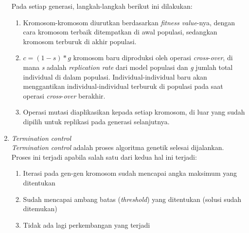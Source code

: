 \begin{enumerate}[1.]
Pada setiap generasi, langkah-langkah berikut ini dilakukan:
\begin{enumerate}[1.]
	\item Kromosom-kromosom diurutkan berdasarkan \textit{fitness value}-nya, dengan cara kromosom terbaik ditempatkan di awal populasi, sedangkan kromosom terburuk di akhir populasi.
	\item \begin{math} c = (1 - s) * g \end{math} kromosom baru diproduksi oleh operasi \textit{cross}-\textit{over}, di mana \textit{s} adalah \textit{replication rate} dari model populasi dan \textit{g} jumlah total individual di dalam populasi. Individual-individual baru akan menggantikan individual-individual terburuk di populasi pada saat operasi \textit{cross}-\textit{over} berakhir.
	\item Operasi mutasi diaplikasikan kepada setiap kromosom, di luar yang sudah dipilih untuk replikasi pada generasi selanjutnya.
\end{enumerate}

\item \textit{Termination control}
\\
\textit{Termination control} adalah proses algoritma genetik selesai dijalankan. Proses ini terjadi apabila salah satu dari kedua hal ini terjadi:
	\begin{enumerate}[1.]
		\item Iterasi pada gen-gen kromosom sudah mencapai angka maksimum yang ditentukan
		\item Sudah mencapai ambang batas (\textit{threshold}) yang ditentukan (solusi sudah ditemukan)
		\item Tidak ada lagi perkembangan yang terjadi
	\end{enumerate}

\end{enumerate}
